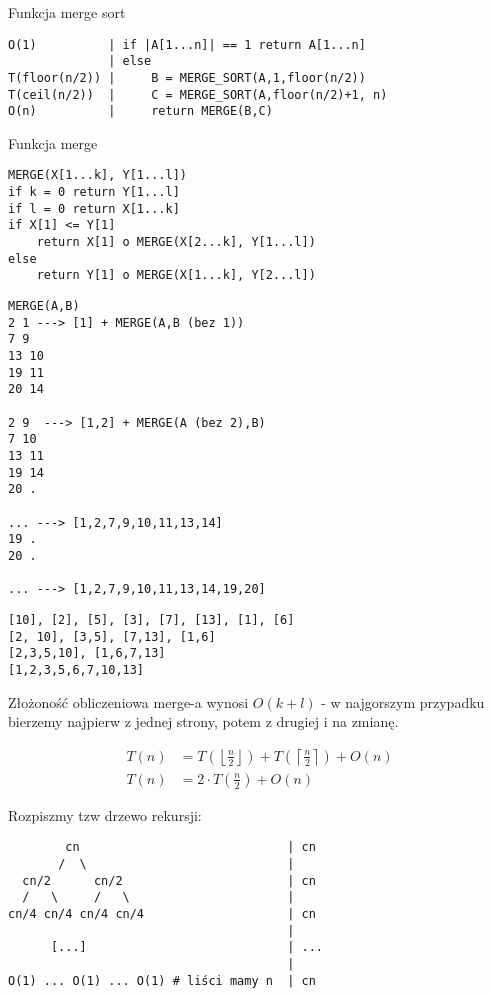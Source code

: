 \documentclass{article}
\begin{document}
\newpage

\noindent
Funkcja merge sort
\begin{verbatim}
O(1)          | if |A[1...n]| == 1 return A[1...n]
              | else
T(floor(n/2)) |     B = MERGE_SORT(A,1,floor(n/2))
T(ceil(n/2))  |     C = MERGE_SORT(A,floor(n/2)+1, n)
O(n)          |     return MERGE(B,C)
\end{verbatim}

\noindent
Funkcja merge
\begin{verbatim}
MERGE(X[1...k], Y[1...l])
if k = 0 return Y[1...l]
if l = 0 return X[1...k]
if X[1] <= Y[1]
    return X[1] o MERGE(X[2...k], Y[1...l])
else   
    return Y[1] o MERGE(X[1...k], Y[2...l])
\end{verbatim}

\begin{verbatim}
MERGE(A,B)
2 1 ---> [1] + MERGE(A,B (bez 1))
7 9
13 10
19 11
20 14
  
2 9  ---> [1,2] + MERGE(A (bez 2),B)
7 10
13 11
19 14
20 .

... ---> [1,2,7,9,10,11,13,14]
19 .
20 .

... ---> [1,2,7,9,10,11,13,14,19,20]
\end{verbatim}

\begin{verbatim}
[10], [2], [5], [3], [7], [13], [1], [6]
[2, 10], [3,5], [7,13], [1,6]
[2,3,5,10], [1,6,7,13]
[1,2,3,5,6,7,10,13]
\end{verbatim}

\noindent
Złożoność obliczeniowa merge-a wynosi $O(k+l)$ - w najgorszym przypadku bierzemy najpierw z jednej strony, potem z drugiej i na zmianę.

\begin{align}
    T(n) &= T\left(\left\lfloor \frac{n}{2} \right\rfloor\right) + T\left(\left\lceil \frac{n}{2} \right\rceil\right) + O(n)\\
    T(n) &= 2\cdot T\left(\frac{n}{2}\right) + O(n)
\end{align}

\newpage

\noindent
Rozpiszmy tzw drzewo rekursji:

\begin{verbatim}
        cn                             | cn
       /  \                            |
  cn/2      cn/2                       | cn
  /   \     /   \                      |
cn/4 cn/4 cn/4 cn/4                    | cn
                                       |
      [...]                            | ...
                                       |
O(1) ... O(1) ... O(1) # liści mamy n  | cn
\end{verbatim}
\end{document}
